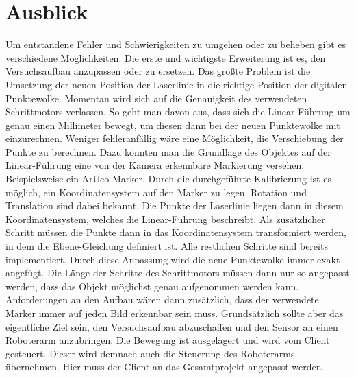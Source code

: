 \section{Ausblick}\label{ausblick}
	Um entstandene Fehler und Schwierigkeiten zu umgehen oder zu beheben gibt es verschiedene Möglichkeiten. Die erste und wichtigste Erweiterung ist es, den Versuchsaufbau anzupassen oder zu ersetzen. Das größte Problem ist die Umsetzung der neuen Position der Laserlinie in die richtige Position der digitalen Punktewolke. Momentan wird sich auf die Genauigkeit des verwendeten Schrittmotors verlassen. So geht man davon aus, dass sich die Linear-Führung um genau einen Millimeter bewegt, um diesen dann bei der neuen Punktewolke mit einzurechnen. Weniger fehleranfällig wäre eine Möglichkeit, die Verschiebung der Punkte zu berechnen. Dazu könnten man die Grundlage des Objektes auf der Linear-Führung eine von der Kamera erkennbare Markierung versehen. Beispielsweise ein ArUco-Marker. Durch die durchgeführte Kalibrierung ist es möglich, ein Koordinatensystem auf den Marker zu legen. Rotation und Translation sind dabei bekannt. Die Punkte der Laserlinie liegen dann in diesem Koordinatensystem, welches die Linear-Führung beschreibt. Als zusätzlicher Schritt müssen die Punkte dann in das Koordinatensystem transformiert werden, in dem die Ebene-Gleichung definiert ist. Alle restlichen Schritte sind bereits implementiert. Durch diese Anpassung wird die neue Punktewolke immer exakt angefügt. Die Länge der Schritte des Schrittmotors müssen dann nur so angepasst werden, dass das Objekt möglichst genau aufgenommen werden kann. Anforderungen an den Aufbau wären dann zusätzlich, dass der verwendete Marker immer auf jeden Bild erkennbar sein muss. \newline
	Grundsätzlich sollte aber das eigentliche Ziel sein, den Versuchsaufbau abzuschaffen und den Sensor an einen Roboterarm anzubringen. Die Bewegung ist ausgelagert und wird vom Client gesteuert. Dieser wird demnach auch die Steuerung des Roboterarms übernehmen. Hier muss der Client an das Gesamtprojekt angepasst werden. \newline
